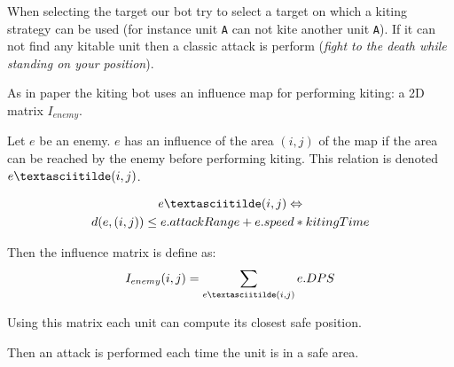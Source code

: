 When selecting the target our bot try to select a target on which a kiting strategy can be used (for instance unit \texttt{A} can not kite another unit \texttt{A}). 
If it can not find any kitable unit then a classic attack is perform (\emph{fight to the death while standing on your position}).

As in paper \cite{kiting} the kiting bot uses an influence map for performing kiting: a 2D matrix $I_{enemy}$.

Let $e$ be an enemy. $e$ has an influence of the area $(i,j)$ of the map if the area can be reached by the enemy before performing kiting.
This relation is denoted $e \textasciitilde (i,j)$.

\begin{multline*}
    e \textasciitilde (i,j) \Leftrightarrow \\ d(e,(i,j)) \leq e.attackRange + e.speed * kitingTime
\end{multline*}

Then the influence matrix is define as:
$$
I_{enemy}(i,j) = \sum_{e \textasciitilde (i,j)}e.DPS  
$$

Using this matrix each unit can compute its closest safe position.

Then an attack is performed each time the unit is in a safe area.

